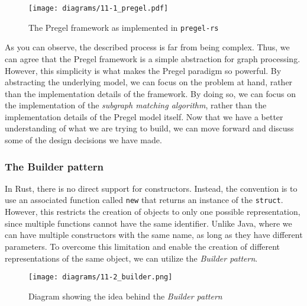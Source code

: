 \begin{figure}[ht]
    \centering
    \texttt{[image: diagrams/11-1\_pregel.pdf]}
    \caption{The Pregel framework as implemented in \texttt{pregel-rs}}
    \label{fig:sequence}
\end{figure}

As you can observe, the described process is far from being complex. Thus, we can agree that the Pregel framework is a simple abstraction for graph processing. However, this simplicity is what makes the Pregel paradigm so powerful. By abstracting the underlying model, we can focus on the problem at hand, rather than the implementation details of the framework. By doing so, we can focus on the implementation of the \textit{subgraph matching algorithm}, rather than the implementation details of the Pregel model itself. Now that we have a better understanding of what we are trying to build, we can move forward and discuss some of the design decisions we have made.

\subsubsection{The Builder pattern}

In Rust, there is no direct support for constructors. Instead, the convention is to use an associated function called \texttt{new} that returns an instance of the \texttt{struct}. However, this restricts the creation of objects to only one possible representation, since multiple functions cannot have the same identifier. Unlike Java, where we can have multiple constructors with the same name, as long as they have different parameters. To overcome this limitation and enable the creation of different representations of the same object, we can utilize the \textit{Builder pattern}.

\begin{figure}[ht]
    \centering
    \texttt{[image: diagrams/11-2\_builder.png]}
    \caption[Diagram showing the idea behind the \textit{Builder pattern}]{Diagram showing the idea behind the \textit{Builder pattern}\footnotemark}
\end{figure}

